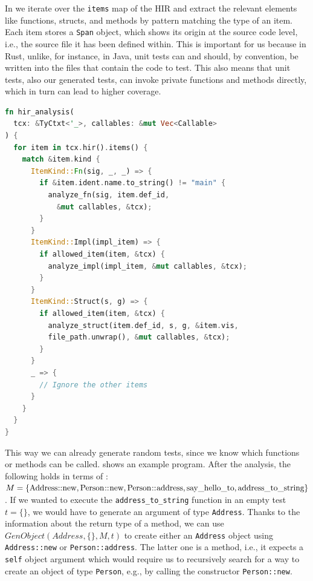\documentclass[paper=a4,%
  twoside,%
  BCOR4mm,%
  abstract=true,%
  toc=bibliography,%
  chapterprefix=true,%
  toc=bibliographynumbered,%
  open=right,%
  english,%
  pagesize=pdftex]{scrreprt}
\begin{document}
In  we iterate over the \lstinline{items} map of the \ac{HIR} and extract the relevant elements like functions, structs, and methods by pattern matching the type of an item. Each item stores a \lstinline{Span} object, which shows its origin at the source code level, i.e., the source file it has been defined within. This is important for us because in Rust, unlike, for instance, in Java, unit tests can and should, by convention, be written into the files that contain the code to test. This also means that unit tests, also our generated tests, can invoke private functions and methods directly, which in turn can lead to higher coverage.

\begin{lstlisting}[language=Rust, style=boxed, caption={Iterate over the items in the HIR of a crate}, label=lst:hir-analysis]
fn hir_analysis(
  tcx: &TyCtxt<'_>, callables: &mut Vec<Callable>
) {
  for item in tcx.hir().items() {
    match &item.kind {
      ItemKind::Fn(sig, _, _) => {
        if &item.ident.name.to_string() != "main" {
          analyze_fn(sig, item.def_id,
            &mut callables, &tcx);
        }
      }
      ItemKind::Impl(impl_item) => {
        if allowed_item(item, &tcx) {
          analyze_impl(impl_item, &mut callables, &tcx);
        }
      }
      ItemKind::Struct(s, g) => {
        if allowed_item(item, &tcx) {
          analyze_struct(item.def_id, s, g, &item.vis,
          file_path.unwrap(), &mut callables, &tcx);
        }
      }
      _ => {
        // Ignore the other items
      }
    }
  }
}
\end{lstlisting}

This way we can already generate random tests, since we know which functions or methods can be called.  shows an example program. After the analysis, the following holds in terms of : $M = \{\lstinline{Address::new}, \lstinline{Person::new}, \lstinline{Person::address}, \lstinline{say_hello_to}, \lstinline{address_to_string}\}$. If we wanted to execute the \lstinline{address_to_string} function in an empty test $t = \{\}$, we would have to generate an argument of type \lstinline{Address}. Thanks to the information about the return type of a method, we can use $GenObject(Address, \{\}, M, t)$ to create either an \lstinline{Address} object using \lstinline{Address::new} or \lstinline{Person::address}. The latter one is a method, i.e., it expects a \lstinline{self} object argument which would require us to recursively search for a way to create an object of type \lstinline{Person}, e.g., by calling the constructor \lstinline{Person::new}.
\end{document}
